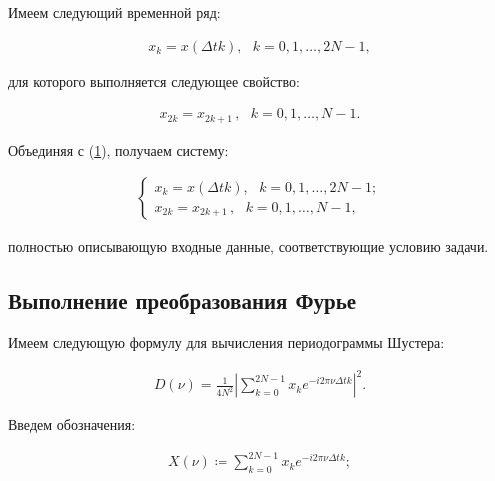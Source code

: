 \documentclass[12pt]{article}
\newcommand{\hl}[1]{(\hyperlink{eq:#1}{#1})}
\newcommand{\sd}[1]{\hypertarget{skip:#1}{\vspace{-10pt}}}
\newcommand{\hep}[2]{\vspace{#2pt}\hypertarget{eq:#1}{}\vspace{-#2pt}}
\newcommand{\hs}[1]{\sd{#1}\hep{#1}{18}}
\newcommand{\hst}[1]{\sd{#1}\hep{#1}{22}}
\begin{document}
Имеем следующий временной ряд:

\hst{1}
\begin{gather}
    x_k = x\left(\Delta t k\right) , \hspace{8pt} k = 0, 1, \ldots, 2N - 1,
\end{gather}

для которого выполняется следующее свойство:

\hst{2}
\begin{gather}
    x_{2k} = x_{2k+1} \hspace{2pt} , \hspace{8pt} k = 0, 1, \ldots, N - 1.
\end{gather}

Объединяя с \hl{1}, получаем систему:

\hs{3}
\begin{gather}
    \begin{cases}
        x_k = x\left(\Delta t k\right) , \hspace{8pt} k = 0, 1, \ldots, 2N - 1; \\
        x_{2k} = x_{2k+1} \hspace{2pt} , \hspace{8pt} k = 0, 1, \ldots, N - 1,
    \end{cases}
\end{gather}

\vspace{5pt}

полностью описывающую входные данные, соответствующие условию задачи.

\subsection{Выполнение преобразования Фурье}

Имеем следующую формулу для вычисления периодограммы Шустера:

\hs{4}
\begin{gather}
    D(\nu) = \frac{1}{4 N^2} \left| \sum_{k = 0}^{2 N - 1} x_k e^{-i 2 \pi \nu \Delta t k} \right|^2.
\end{gather}

Введем обозначения:

\sd{5}
\begin{gather}
    X( \nu ) \coloneqq \sum_{k = 0}^{2 N - 1} x_k e^{-i 2 \pi \nu \Delta t k };
\end{gather}

\begin{minipage}[t][5pt]{10pt}
     
\end{minipage}
\end{document}
